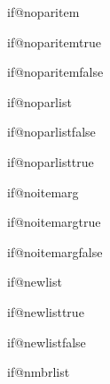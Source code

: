 \begin{docCommand}{if@noparitem}{}
 \end{docCommand}
 \begin{docCommand}{ if@noparitemtrue}{}
 \end{docCommand}
 \begin{docCommand}{ if@noparitemfalse}{}
 \end{docCommand}
 
\begin{teX}
\newif\if@noparitem \@noparitemfalse
\end{teX}
 

\begin{docCommand} {if@noparlist} { }
  \end{docCommand}
  
\begin{docCommand} {if@noparlistfalse}{}
\end{docCommand}

\begin{docCommand} {if@noparlisttrue}{}
\end{docCommand}  
  
\begin{teX}
\newif\if@noparlist \@noparlistfalse
\end{teX}


\begin{docCommand} {if@noitemarg} { }
\end{docCommand}

\begin{docCommand}{if@noitemargtrue}{}
\end{docCommand}  

\begin{docCommand}{if@noitemargfalse}{}
\end{docCommand}  

    \begin{teX}
\newif\if@noitemarg \@noitemargfalse
    \end{teX}


\begin{docCommand}{if@newlist}{}
\end{docCommand}

\begin{docCommand}{if@newlisttrue}{}
\end{docCommand}  
\begin{docCommand}{if@newlistfalse}{}
\end{docCommand}  
\begin{docCommand}{if@nmbrlist}{}
\end{docCommand}
  
